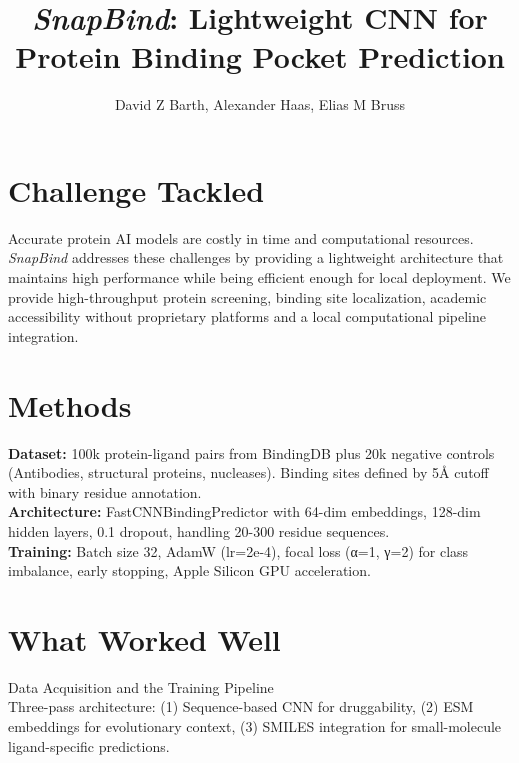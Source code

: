 \documentclass[11pt,a4paper]{article}
\title{\vspace{-0.5cm}\textit{SnapBind}: Lightweight CNN for Protein Binding Pocket Prediction}
\author{David Z Barth, Alexander Haas, Elias M Bruss}
\date{}
\begin{document}
\vspace{1cm}
\maketitle
\vspace{-0.3cm}

\begin{multicols}{2} 

\section{Challenge Tackled}
Accurate protein AI models are costly in time and computational resources. \textit{SnapBind} addresses these challenges by providing a lightweight architecture that maintains high performance while being efficient enough for local deployment.
We provide high-throughput protein screening, binding site localization, academic accessibility without proprietary platforms and a local computational pipeline integration.

\section{Methods}

\noindent \quad \textbf{Dataset:} 100k protein-ligand pairs from BindingDB plus 20k negative controls (Antibodies, structural proteins, nucleases). Binding sites defined by 5Å cutoff with binary residue annotation. \\

\noindent \quad \textbf{Architecture:} FastCNNBindingPredictor with 64-dim embeddings, 128-dim hidden layers, 0.1 dropout, handling 20-300 residue sequences.\\

\noindent \quad \textbf{Training:} Batch size 32, AdamW (lr=2e-4), focal loss (α=1, γ=2) for class imbalance, early stopping, Apple Silicon GPU acceleration.

\section{What Worked Well}

Data Acquisition and the Training Pipeline \\

Three-pass architecture: (1) Sequence-based CNN for druggability, (2) ESM embeddings for evolutionary context, (3) SMILES integration for small-molecule ligand-specific predictions.\\


\end{multicols}
\end{document}
